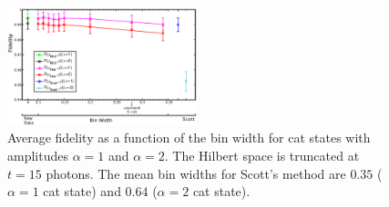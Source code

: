 \documentclass[
reprint,
superscriptaddress,
showpacs,
amsmath,
amssymb,
aps,
pra,
longbibliography
]{revtex4-1}
\begin{document}
\begin{figure}
  \includegraphics[width=0.49\textwidth]{catstate-alpha=1and2-15photons.eps}
  \caption{Average fidelity as a function of the bin width for cat
    states with amplitudes $\alpha=1$ and $\alpha=2$. The Hilbert
    space is truncated at $t=15$ photons. The mean bin widths for
    Scott's method are $0.35$ ($\alpha=1$ cat state) and $0.64$
    ($\alpha=2$ cat state).}
  \label{fig-fidelity_vs_binwidth_15_photons_catstate}
\end{figure}



\end{document}
